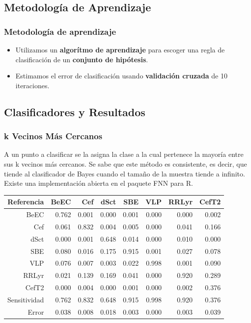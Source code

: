 \documentclass{beamer}
\begin{document}
\subsection{Metodología de Aprendizaje}
\begin{frame} %
  \frametitle{Metodología de aprendizaje}
  \begin{itemize}
  \item Utilizamos un \textbf{algorítmo de aprendizaje} para escoger una regla de clasificación de un \textbf{conjunto de hipótesis}.
  \item Estimamos el error de clasificación usando \textbf{validación cruzada} de 10 iteraciones.
  \end{itemize}
\end{frame}


\subsection{Clasificadores y Resultados}
\begin{frame}%
  \frametitle{k Vecinos Más Cercanos}
A un punto a clasificar se la asigna la clase a la cual pertenece la mayoría entre sus k vecinos más cercanos. Se sabe que este método es consistente, es decir, que tiende al clasificador de Bayes cuando el tamaño de la muestra tiende a infinito. Existe una implementación abierta en el paquete FNN para R.

    \begin{table}[ht]
      \centering
  \resizebox{0.7\textwidth}{!} {
      \begin{tabular}{rrrrrrrr}
        \hline
        \hline
        Referencia& BeEC & Cef & dSct & SBE & VLP & RRLyr & CefT2 \\ 
        \hline
        \hline
        BeEC & 0.762 & 0.001 & 0.000 & 0.001 & 0.000 & 0.000 & 0.002 \\ 
        Cef & 0.061 & 0.832 & 0.004 & 0.005 & 0.000 & 0.041 & 0.166 \\ 
        dSct & 0.000 & 0.001 & 0.648 & 0.014 & 0.000 & 0.010 & 0.000 \\ 
        SBE & 0.080 & 0.016 & 0.175 & 0.915 & 0.001 & 0.027 & 0.078 \\ 
        VLP & 0.076 & 0.007 & 0.003 & 0.022 & 0.998 & 0.001 & 0.090 \\ 
        RRLyr & 0.021 & 0.139 & 0.169 & 0.041 & 0.000 & 0.920 & 0.289 \\ 
        CefT2 & 0.000 & 0.004 & 0.000 & 0.001 & 0.000 & 0.002 & 0.376 \\ 
        \hline
        \hline
        Sensitividad & 0.762 & 0.832 & 0.648 & 0.915 & 0.998 & 0.920 & 0.376 \\ 
        \hline
        Error & 0.038 & 0.008 & 0.018 & 0.003 & 0.000 & 0.003 & 0.039 \\ 
        \hline
        \hline
      \end{tabular}
    }
    \end{table}
\end{frame}
\end{document}
